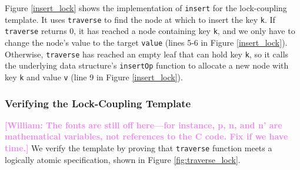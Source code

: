 \documentclass[a4paper,UKenglish,cleveref, autoref, thm-restate]{lipics-v2021}
\newcommand{\than}[1]{\textbf{\textcolor{blue}{[Than: #1]}}}
\newcommand{\wm}[1]{\textbf{\textcolor{violet}{[William: #1]}}}
\begin{document}

Figure \ref{insert_lock} shows the implementation of \lstinline{insert} for the lock-coupling template.
It uses \texttt{traverse} to find the node at which to insert the key \lstinline{k}. If \texttt{traverse} returns 0, it has reached a node containing key \texttt{k}, and we only have to change the node's value to the target \texttt{value} (lines 5-6 in Figure \ref{insert_lock}). Otherwise, \texttt{traverse} has reached an empty leaf that can hold key \texttt{k}, so it calls the underlying data structure's \texttt{insertOp} function to allocate a new node with key \texttt{k} and value \texttt{v} (line 9 in Figure \ref{insert_lock}).

\subsubsection{Verifying the Lock-Coupling Template}
\label{traverse_proof_lock}

\wm{The fonts are still off here---for instance, p, n, and n' are mathematical variables, not references to the C code. Fix if we have time.}
We verify the template by proving that \lstinline{traverse} function meets a logically atomic specification, shown in Figure \ref{fig:traverse_lock}.
\end{document}
